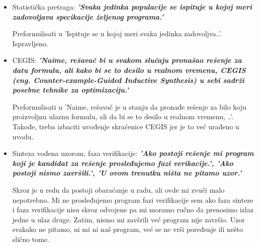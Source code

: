 \documentclass[a4paper]{report}
\newcommand{\odgovor}[1]{\textcolor{blue}{#1}}
\begin{document}
\begin{itemize}
	Bolje bi zvučalo: 'Prilikom svake iteracije se generišu ograničenja, rešavačem se dođe do mogućeg rešenja a zatim se ispita da li je ono zadovoljavajuće kao opšte rešenje.' ili nešto tome slično.
	\odgovor Ispravljeno.

    \item Statistička pretraga: \textbf{\textit{'Svaka jedinka populacije se ispituje u kojoj meri zadovoljava specikacije željenog programa.'}}

    Preformulisati u 'Ispituje se u kojoj meri svaka jedinka zadovoljva..'.
	\odgovor Ispravljeno.

    \item CEGIS: \textbf{\textit{'Naime, rešavač bi u svakom slučaju pronašao rešenje za datu formulu, ali kako bi se to desilo u realnom vremenu, CEGIS (eng. Counter-example-Guided Inductive Synthesis) u sebi sadrži posebne tehnike za optimizaciju.'}}

    Preformulisati u 'Naime, rešavač je u stanju da pronađe rešenje za bilo koju proizvoljnu ulaznu formulu, ali da bi se to desilo u realnom vremenu, ..'. Takođe, treba izbaciti uvođenje skraćenice CEGIS jer je to već urađeno u uvodu.

    \item Sinteza vođena uzorom, faza verifikacije: \textbf{\textit{'Ako postoji rešenje mi program koji je kandidat za rešenje prosleđujemo fazi verikacije.', 'Ako postoji nismo završili.', 'U ovom trenutku ništa ne pitamo uzor.'}}

    Skroz je u redu da postoji obaraćanje u radu, ali ovde mi zvuči malo nepotrebno. Mi ne prosleđujemo program fazi verifikacije sem ako faza sinteze i faza verifikacije nisu skroz odvojene pa mi moramo ručno da prenosimo izlaz jedne u ulaz druge. Zatim, nismo mi zavšrili već program nije završio. Uzor svakako ne pitamo, ni mi ni naš program, već se ne vrši poređenje ili nešto slično tome.
\end{itemize}
\end{document}
